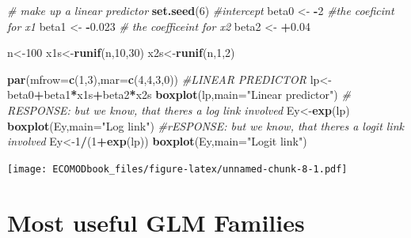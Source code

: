 \documentclass[
]{book}
\newenvironment{Shaded}{\begin{snugshade}}{\end{snugshade}}
\newcommand{\AttributeTok}[1]{\textcolor[rgb]{0.13,0.29,0.53}{#1}}
\newcommand{\CommentTok}[1]{\textcolor[rgb]{0.56,0.35,0.01}{\textit{#1}}}
\newcommand{\DecValTok}[1]{\textcolor[rgb]{0.00,0.00,0.81}{#1}}
\newcommand{\FloatTok}[1]{\textcolor[rgb]{0.00,0.00,0.81}{#1}}
\newcommand{\FunctionTok}[1]{\textcolor[rgb]{0.13,0.29,0.53}{\textbf{#1}}}
\newcommand{\NormalTok}[1]{#1}
\newcommand{\OtherTok}[1]{\textcolor[rgb]{0.56,0.35,0.01}{#1}}
\newcommand{\SpecialCharTok}[1]{\textcolor[rgb]{0.81,0.36,0.00}{\textbf{#1}}}
\newcommand{\StringTok}[1]{\textcolor[rgb]{0.31,0.60,0.02}{#1}}
\begin{document}
\begin{Shaded}
\begin{Highlighting}[]
\CommentTok{\# make up a linear predictor}
\FunctionTok{set.seed}\NormalTok{(}\DecValTok{6}\NormalTok{)}
\CommentTok{\#intercept}
\NormalTok{beta0 }\OtherTok{\textless{}{-}} \SpecialCharTok{{-}}\DecValTok{2}
\CommentTok{\#the coeficint for x1}
\NormalTok{beta1 }\OtherTok{\textless{}{-}} \SpecialCharTok{{-}}\FloatTok{0.023}
\CommentTok{\# the coefficeint for x2}
\NormalTok{beta2 }\OtherTok{\textless{}{-}} \SpecialCharTok{+}\FloatTok{0.04}

\NormalTok{n}\OtherTok{\textless{}{-}}\DecValTok{100}
\NormalTok{x1s}\OtherTok{\textless{}{-}}\FunctionTok{runif}\NormalTok{(n,}\DecValTok{10}\NormalTok{,}\DecValTok{30}\NormalTok{)}
\NormalTok{x2s}\OtherTok{\textless{}{-}}\FunctionTok{runif}\NormalTok{(n,}\DecValTok{1}\NormalTok{,}\DecValTok{2}\NormalTok{)}

\FunctionTok{par}\NormalTok{(}\AttributeTok{mfrow=}\FunctionTok{c}\NormalTok{(}\DecValTok{1}\NormalTok{,}\DecValTok{3}\NormalTok{),}\AttributeTok{mar=}\FunctionTok{c}\NormalTok{(}\DecValTok{4}\NormalTok{,}\DecValTok{4}\NormalTok{,}\DecValTok{3}\NormalTok{,}\DecValTok{0}\NormalTok{))}
\CommentTok{\#LINEAR PREDICTOR}
\NormalTok{lp}\OtherTok{\textless{}{-}}\NormalTok{beta0}\SpecialCharTok{+}\NormalTok{beta1}\SpecialCharTok{*}\NormalTok{x1s}\SpecialCharTok{+}\NormalTok{beta2}\SpecialCharTok{*}\NormalTok{x2s}
\FunctionTok{boxplot}\NormalTok{(lp,}\AttributeTok{main=}\StringTok{"Linear predictor"}\NormalTok{)}
\CommentTok{\# RESPONSE: but we know, that there\textquotesingle{}s a log link involved}
\NormalTok{Ey}\OtherTok{\textless{}{-}}\FunctionTok{exp}\NormalTok{(lp)}
\FunctionTok{boxplot}\NormalTok{(Ey,}\AttributeTok{main=}\StringTok{"Log link"}\NormalTok{)}
\CommentTok{\#rESPONSE: but we know, that there\textquotesingle{}s a logit link involved}
\NormalTok{Ey}\OtherTok{\textless{}{-}}\DecValTok{1}\SpecialCharTok{/}\NormalTok{(}\DecValTok{1}\SpecialCharTok{+}\FunctionTok{exp}\NormalTok{(lp))}
\FunctionTok{boxplot}\NormalTok{(Ey,}\AttributeTok{main=}\StringTok{"Logit link"}\NormalTok{)}
\end{Highlighting}
\end{Shaded}

\texttt{[image: ECOMODbook\_files/figure-latex/unnamed-chunk-8-1.pdf]}

\hypertarget{most-useful-glm-families}{%
\section{Most useful GLM Families}\label{most-useful-glm-families}}
\end{document}
